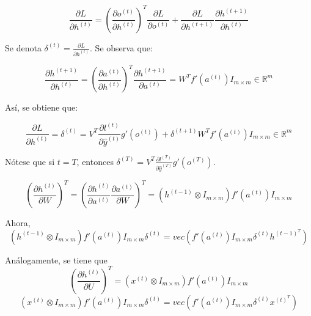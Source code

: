 \documentclass[12pt,twoside]{article}
\begin{document}
\begin{equation}
\frac{\partial L}{\partial h^{(t)}} = \left( \frac{\partial o^{(t)}}{\partial h^{(t)}} \right )^T \frac{\partial L}{\partial o^{(t)}} + \frac{\partial L}{\partial h^{(t+1)}}\frac{\partial h^{(t+1)}}{\partial h^{(t)}}
\end{equation}

Se denota $\delta^{(t)} = \frac{\partial L}{\partial h^{(t)}}$. Se observa que:

\begin{equation}
\frac{\partial h^{(t+1)}}{\partial h^{(t)}} = \left( \frac{\partial a^{(t)}}{\partial h^{(t)}} \right)^T \frac{\partial h^{(t+1)}}{\partial a^{(t)}} = W^T f'(a^{(t)})I_{m \times m} \in \mathbb{R}^m
\end{equation}

Así, se obtiene que:

\begin{equation}
\frac{\partial L}{\partial h^{(t)}} = \delta^{(t)} = V^T \frac{\partial l^{(t)}}{\partial \hat{y}^{(t)}} g'(o^{(t)}) + \delta^{(t+1)} W^T f'(a^{(t)})I_{m \times m} \in \mathbb{R}^m
\end{equation}

Nótese que si $t=T$, entonces $\delta^{(T)} = V^T \frac{\partial l^{(T)}}{\partial \hat{y}^{(T)}} g'(o^{(T)})$.

\begin{equation}
\left( \frac{\partial h^{(t)}}{\partial W} \right)^T = \left( \frac{\partial h^{(t)}}{\partial a^{(t)}} \frac{\partial a^{(t)}}{\partial W} \right)^T = (h^{(t-1)} \otimes I_{m \times m}) f'(a^{(t)}) I_{m \times m}
\end{equation}

Ahora, 
\begin{equation}
(h^{(t-1)} \otimes I_{m \times m}) f'(a^{(t)}) I_{m \times m}\delta^{(t)} = vec(f'(a^{(t)}) I_{m \times m}\delta^{(t)}h^{(t-1)^T})
\end{equation}

Análogamente, se tiene que
\begin{equation}
\left( \frac{\partial h^{(t)}}{\partial U} \right)^T = (x^{(t)} \otimes I_{m \times m}) f'(a^{(t)}) I_{m \times m}
\end{equation}
\begin{equation}
(x^{(t)} \otimes I_{m \times m}) f'(a^{(t)}) I_{m \times m}\delta^{(t)} = vec(f'(a^{(t)}) I_{m \times m}\delta^{(t)}x^{(t)^T})
\end{equation}
\end{document}
